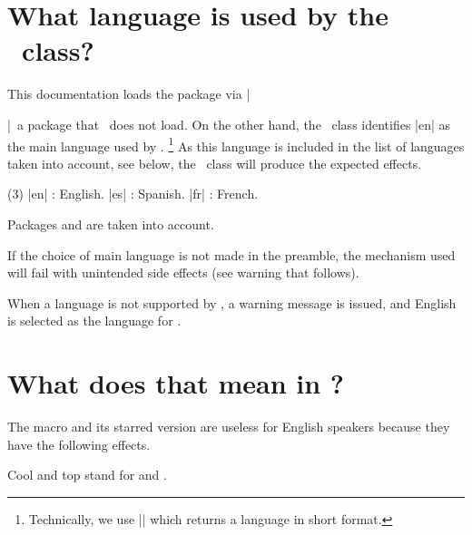 \section{What language is used by the \thisproj\ class?}

This documentation loads the  package via \tdocinlatex|\usepackage[english]{babel}|\, a package that \thisproj\ does not load.
On the other hand, the \thisproj\ class identifies \tdocinlatex|en| as the main language used by .%
\footnote{
    Technically, we use \tdocinlatex|| which returns a language in short format.
}
As this language is included in the list of languages taken into account, see below, the \thisproj\ class will produce the expected effects.

\begin{tasks}[label=\small\textbullet](3)
    \task \tdocinlatex|en| : English.
        \task \tdocinlatex|es| : Spanish.
        \task \tdocinlatex|fr| : French.
\end{tasks}
                    


\begin{tdocnote}
    Packages  and  are taken into account.
\end{tdocnote}


\begin{tdoccaut}
    If the choice of main language is not made in the preamble, the mechanism used will fail with unintended side effects (see warning that follows).
\end{tdoccaut}


\begin{tdocwarn}
    When a language is not supported by \thisproj, a warning message is issued, and English is selected as the language for \thisproj.
\end{tdocwarn}


\section{What does that mean in ?}

The macro  and its starred version are useless for English speakers because they have the following effects.


\begin{tdoclatex}
Cool and top stand for  and .
\end{tdoclatex}


